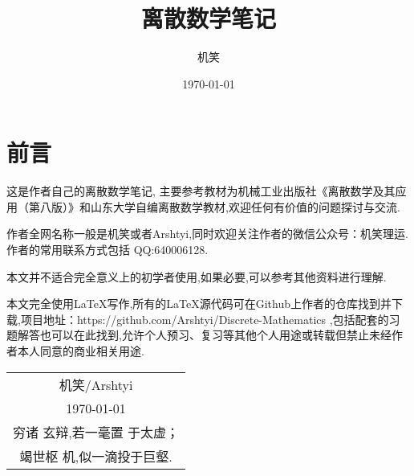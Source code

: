 \documentclass[12pt,a4paper,UTF8,twoside]{ctexbook}
\title{\textbf{离散数学笔记}}
\author{机笑}
\date{\today}
\theoremstyle{mydefinition}
\begin{document}
\thispagestyle{empty}
\maketitle
\thispagestyle{empty}
\newpage
\section*{前言}
\thispagestyle{empty}
这是作者自己的离散数学笔记,
主要参考教材为机械工业出版社《离散数学及其应用（第八版）》和山东大学自编离散数学教材,欢迎任何有价值的问题探讨与交流.

作者全网名称一般是机笑或者Arshtyi,同时欢迎关注作者的微信公众号：机笑理运.作者的常用联系方式包括 QQ:640006128.

本文并不适合完全意义上的初学者使用,如果必要,可以参考其他资料进行理解.

本文完全使用\LaTeX 写作,所有的\LaTeX 源代码可在Github上作者的仓库找到并下载,项目地址：https://github.com/Arshtyi/Discrete-Mathematics ,包括配套的习题解答也可以在此找到,允许个人预习、复习等其他个人用途或转载但禁止未经作者本人同意的商业相关用途.
\begin{flushright}
    \begin{tabular}{c}
        机笑/Arshtyi\\
        \today \\ 穷诸
        玄辩,若一毫置
        于太虚；\\ 竭世枢
        机,似一滴投于巨壑.
    \end{tabular}
\end{flushright}
\thispagestyle{empty}
\newpage
{}
\setcounter{page}{1}
\pagestyle{plain}
\tableofcontents
\newpage
\setcounter{page}{1}
\pagestyle{fancy}
\fancyhf{}
\fancyhead[LO,RE]{\rightmark}
\fancyfoot[LO,RE]{\thepage}


\newpage
{}
\setcounter{page}{1}
\pagestyle{plain}
\nocite{*}

\clearpage
{}
{}

\end{document}
